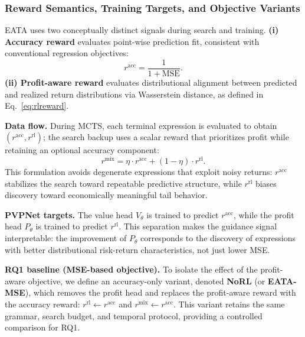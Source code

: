 \subsubsection{Reward Semantics, Training Targets, and Objective Variants}
\label{subsec:reward_flow}

EATA uses two conceptually distinct signals during search and training.
\textbf{(i) Accuracy reward} evaluates point-wise prediction fit, consistent with conventional regression objectives:
\begin{equation}
r^{\text{acc}} = \frac{1}{1 + \text{MSE}}.
\label{eq:racc}
\end{equation}
\textbf{(ii) Profit-aware reward} evaluates distributional alignment between predicted and realized return distributions via Wasserstein distance, as defined in Eq.~\ref{eq:rlreward}.

\textbf{Data flow.} During MCTS, each terminal expression is evaluated to obtain $(r^{\text{acc}}, r^{\text{rl}})$; the search backup uses a scalar reward that prioritizes profit while retaining an optional accuracy component:
\begin{equation}
r^{\text{mix}} = \eta \cdot r^{\text{acc}} + (1-\eta) \cdot r^{\text{rl}}.
\label{eq:rmix}
\end{equation}
This formulation avoids degenerate expressions that exploit noisy returns: $r^{\text{acc}}$ stabilizes the search toward repeatable predictive structure, while $r^{\text{rl}}$ biases discovery toward economically meaningful tail behavior.

\textbf{PVPNet targets.} The value head $V_{\theta}$ is trained to predict $r^{\text{acc}}$, while the profit head $P_{\theta}$ is trained to predict $r^{\text{rl}}$. This separation makes the guidance signal interpretable: the improvement of $P_{\theta}$ corresponds to the discovery of expressions with better distributional risk-return characteristics, not just lower MSE.

\textbf{RQ1 baseline (MSE-based objective).} To isolate the effect of the profit-aware objective, we define an accuracy-only variant, denoted \textbf{NoRL} (or \textbf{EATA-MSE}), which removes the profit head and replaces the profit-aware reward with the accuracy reward: $r^{\text{rl}} \leftarrow r^{\text{acc}}$ and $r^{\text{mix}} \leftarrow r^{\text{acc}}$. This variant retains the same grammar, search budget, and temporal protocol, providing a controlled comparison for RQ1.

